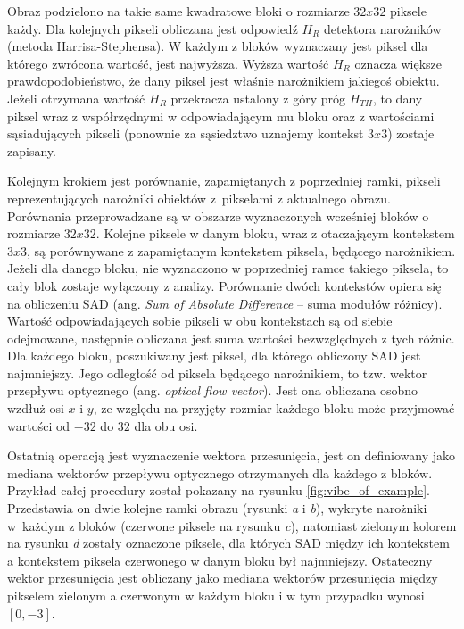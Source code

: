 Obraz podzielono na takie same kwadratowe bloki o rozmiarze $32x32$ piksele każdy. Dla kolejnych pikseli obliczana jest odpowiedź $H_R$ detektora narożników (metoda Harrisa-Stephensa). %
W każdym z bloków wyznaczany jest piksel dla którego zwrócona wartość, jest najwyższa. Wyższa wartość $H_R$ oznacza większe prawdopodobieństwo, że dany piksel jest właśnie narożnikiem jakiegoś obiektu. Jeżeli otrzymana wartość $H_R$ przekracza ustalony z góry próg $H_{TH}$, to dany piksel wraz z współrzędnymi w odpowiadającym mu bloku oraz z wartościami sąsiadujących pikseli (ponownie za sąsiedztwo uznajemy kontekst $3x3$) zostaje zapisany.

Kolejnym krokiem jest porównanie, zapamiętanych z poprzedniej ramki, pikseli reprezentujących narożniki obiektów z~pikselami z aktualnego obrazu. Porównania przeprowadzane są w obszarze wyznaczonych wcześniej bloków o rozmiarze $32x32$. Kolejne piksele w danym bloku, wraz z otaczającym kontekstem $3x3$, są porównywane z zapamiętanym kontekstem piksela, będącego narożnikiem. Jeżeli dla danego bloku, nie wyznaczono w poprzedniej ramce takiego piksela, to cały blok zostaje wyłączony z analizy. Porównanie dwóch kontekstów opiera się na obliczeniu SAD (ang. \textit{Sum of Absolute Difference} -- suma modułów różnicy). Wartość odpowiadających sobie pikseli w obu kontekstach są od siebie odejmowane, następnie obliczana jest suma wartości bezwzględnych z tych różnic. Dla każdego bloku, poszukiwany jest piksel, dla którego obliczony SAD jest najmniejszy. Jego odległość od piksela będącego narożnikiem, to tzw. wektor przepływu optycznego (ang. \textit{optical flow vector}). %
Jest ona obliczana osobno wzdłuż osi $x$ i $y$, ze względu na przyjęty rozmiar każdego bloku może przyjmować wartości od $-32$ do $32$ dla obu osi.

Ostatnią operacją jest wyznaczenie wektora przesunięcia, jest on definiowany jako mediana wektorów przepływu optycznego otrzymanych dla każdego z bloków. 
Przykład całej procedury został pokazany na rysunku \ref{fig:vibe_of_example}. 
Przedstawia on dwie kolejne ramki obrazu (rysunki \textit{a} i \textit{b}), wykryte narożniki w~każdym z bloków (czerwone piksele na rysunku \textit{c}), natomiast zielonym kolorem na rysunku \textit{d} zostały oznaczone piksele, dla których SAD między ich kontekstem a kontekstem piksela czerwonego w danym bloku był najmniejszy. 
Ostateczny wektor przesunięcia jest obliczany jako mediana wektorów przesunięcia między pikselem zielonym a czerwonym w każdym bloku i w tym przypadku wynosi $[0,-3]$.

